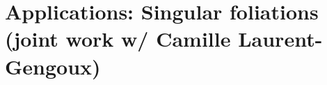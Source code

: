\documentclass[hyperref={pdfpagelabels=false}]{beamer}
\def\bas#1\eas{\begin{align*}#1\end{align*}}
\theoremstyle{plain}
\theoremstyle{remark}
\newtheorem*{remark}{Remarks}
\begin{document}
%
%
%
%
%




{
\section[Foliations]{Applications: Singular foliations \\(joint work w/ Camille Laurent-Gengoux)}
}
\end{document}
